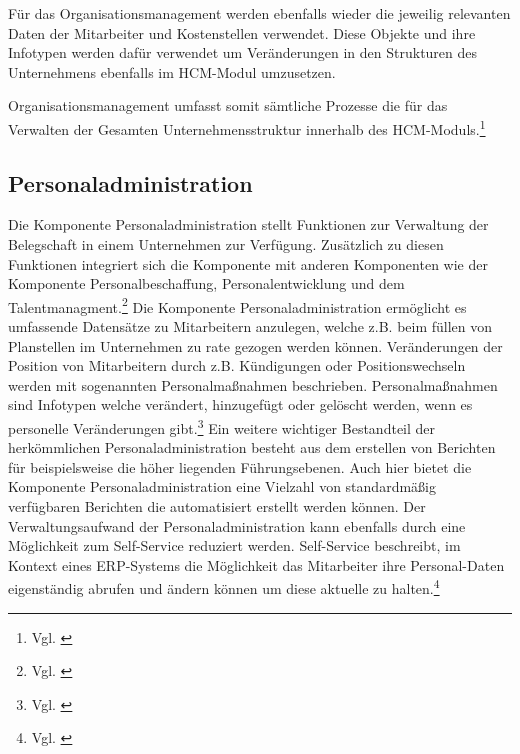 Für das Organisationsmanagement werden ebenfalls wieder die jeweilig relevanten Daten der Mitarbeiter und Kostenstellen verwendet. Diese Objekte und ihre Infotypen werden dafür verwendet um Veränderungen in den Strukturen des Unternehmens ebenfalls im HCM-Modul umzusetzen. 

Organisationsmanagement umfasst somit sämtliche Prozesse die für das Verwalten der Gesamten Unternehmensstruktur innerhalb des HCM-Moduls.\footnote{Vgl. \cite{SAPSE2024a}}

\subsection{Personaladministration}
Die Komponente Personaladministration stellt Funktionen zur Verwaltung der Belegschaft in einem Unternehmen zur Verfügung. Zusätzlich zu diesen Funktionen integriert sich die Komponente mit anderen Komponenten wie der Komponente Personalbeschaffung, Personalentwicklung und dem Talentmanagment.\footnote{Vgl. \cite{SAPSE2022}} Die Komponente Personaladministration ermöglicht es umfassende Datensätze zu Mitarbeitern anzulegen, welche z.B. beim füllen von Planstellen im Unternehmen zu rate gezogen werden können. Veränderungen der Position von Mitarbeitern durch z.B. Kündigungen oder Positionswechseln werden mit sogenannten Personalmaßnahmen beschrieben. Personalmaßnahmen sind Infotypen welche verändert, hinzugefügt oder gelöscht werden, wenn es personelle Veränderungen gibt.\footnote{Vgl. \cite{SAPSE2023a}} Ein weitere wichtiger Bestandteil der herkömmlichen Personaladministration besteht aus dem erstellen von Berichten für beispielsweise die höher liegenden Führungsebenen. Auch hier bietet die Komponente Personaladministration eine Vielzahl von standardmäßig verfügbaren Berichten die automatisiert erstellt werden können. Der Verwaltungsaufwand der Personaladministration kann ebenfalls durch eine Möglichkeit zum Self-Service reduziert werden. Self-Service beschreibt, im Kontext eines ERP-Systems die Möglichkeit das Mitarbeiter ihre Personal-Daten eigenständig abrufen und ändern können um diese aktuelle zu halten.\footnote{Vgl. \cite{SAPSE2023}} 

